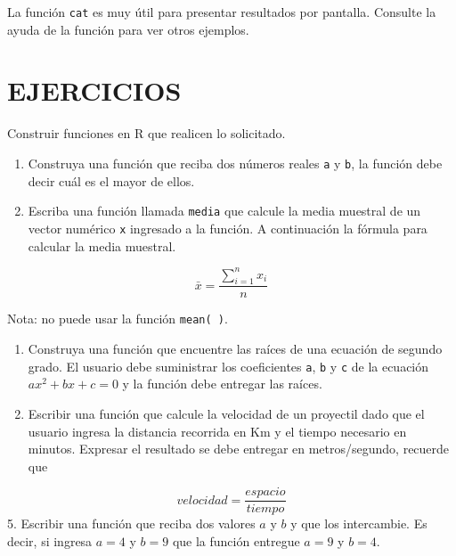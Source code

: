 \documentclass[
]{book}
\makeatletter
\newenvironment{kframe}{%
\medskip{}
\setlength{\fboxsep}{.8em}
 \def\at@end@of@kframe{}%
 \ifinner\ifhmode%
  \def\at@end@of@kframe{\end{minipage}}%
  \begin{minipage}{\columnwidth}%
 \fi\fi%
 \def\FrameCommand##1{\hskip\@totalleftmargin \hskip-\fboxsep
 \colorbox{shadecolor}{##1}\hskip-\fboxsep
     \hskip-\linewidth \hskip-\@totalleftmargin \hskip\columnwidth}%
 \MakeFramed {\advance\hsize-\width
   \@totalleftmargin\z@ \linewidth\hsize
   \@setminipage}}%
 {\par\unskip\endMakeFramed%
 \at@end@of@kframe}
\newenvironment{rmdblock}[1]
  {
  \begin{itemize}
  \renewcommand{\labelitemi}{
    \raisebox{-.7\height}[0pt][0pt]{
      {\setkeys{Gin}{width=3em,keepaspectratio}\texttt{[image: images/\#1]}}
    }
  }
  \setlength{\fboxsep}{1em}
  \begin{kframe}
  \item
  }
  {
  \end{kframe}
  \end{itemize}
  }
\newenvironment{rmdnote}
  {\begin{rmdblock}{note}}
  {\end{rmdblock}}
\makeatother
\begin{document}
\begin{rmdnote}
La función \texttt{cat} es muy útil para presentar resultados por pantalla. Consulte la ayuda de la función para ver otros ejemplos.
\end{rmdnote}

\hypertarget{ejercicios-2}{%
\section*{EJERCICIOS}\label{ejercicios-2}}

Construir funciones en R que realicen lo solicitado.

\begin{enumerate}
\def\labelenumi{\arabic{enumi}.}
\item
  Construya una función que reciba dos números reales \texttt{a} y \texttt{b}, la función debe decir cuál es el mayor de ellos.
\item
  Escriba una función llamada \texttt{media} que calcule la media muestral de un vector numérico \texttt{x} ingresado a la función. A continuación la fórmula para calcular la media muestral.
\end{enumerate}

\[\bar{x}=\frac{\sum_{i=1}^n x_i}{n}\]

Nota: no puede usar la función \texttt{mean(\ )}.

\begin{enumerate}
\def\labelenumi{\arabic{enumi}.}
\setcounter{enumi}{2}
\item
  Construya una función que encuentre las raíces de una ecuación de segundo grado. El usuario debe suministrar los coeficientes \texttt{a}, \texttt{b} y \texttt{c} de la ecuación \(ax^2+bx+c=0\) y la función debe entregar las raíces.
\item
  Escribir una función que calcule la velocidad de un proyectil dado que el usuario ingresa la distancia recorrida en Km y el tiempo necesario en minutos. Expresar el resultado se debe entregar en metros/segundo, recuerde que
\end{enumerate}

\[velocidad = \frac{espacio}{tiempo}\]
5. Escribir una función que reciba dos valores \(a\) y \(b\) y que los intercambie. Es decir, si ingresa \(a=4\) y \(b=9\) que la función entregue \(a=9\) y \(b=4\).
\end{document}
